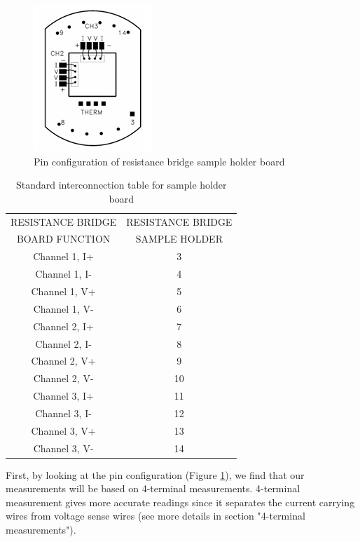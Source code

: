 \documentclass{article}
\begin{document}
            \begin{figure}[H]
                \centering
                \includegraphics[width=0.25\linewidth]{pin out.png}
                \caption{Pin configuration of resistance bridge sample holder board}
                \label{pin out}
            \end{figure}
            \begin{table}[H]
                \centering
                \begin{tabular}{|c|c|}
                \hline
                   RESISTANCE BRIDGE & RESISTANCE BRIDGE\\
                   BOARD FUNCTION & SAMPLE HOLDER\\
                   \hline
                   Channel 1, I+ & 3    \\  \hline
                   Channel 1, I- & 4    \\  \hline
                   Channel 1, V+ & 5    \\  \hline
                   Channel 1, V- & 6    \\  \hline
                   Channel 2, I+ & 7    \\  \hline
                   Channel 2, I- & 8    \\  \hline
                   Channel 2, V+ & 9    \\  \hline
                   Channel 2, V- & 10   \\  \hline
                   Channel 3, I+ & 11   \\  \hline
                   Channel 3, I- & 12   \\  \hline
                   Channel 3, V+ & 13   \\  \hline
                   Channel 3, V- & 14   \\  \hline
                \end{tabular}
                \caption{Standard interconnection table for sample holder board}
                \label{interconn}
            \end{table}

            First, by looking at the pin configuration (Figure \ref{pin out}), we find that our measurements will be based on 4-terminal measurements. 4-terminal measurement gives more accurate readings since it separates the current carrying wires from voltage sense wires (see more details in section "4-terminal measurements").\\
            
\end{document}
